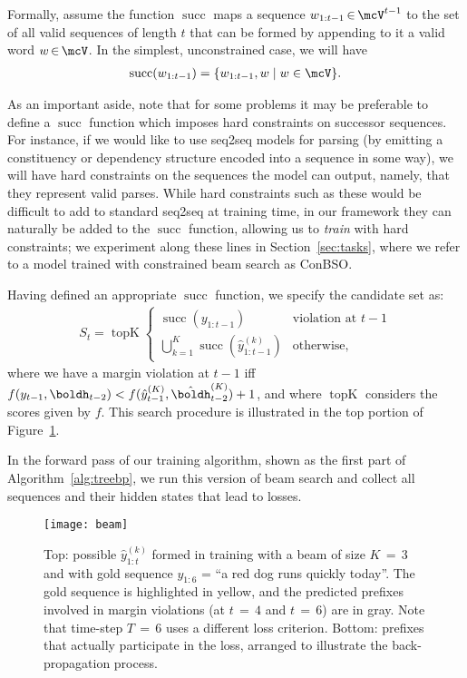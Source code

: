 \documentclass[11pt,letterpaper]{article}
\newcommand{\pfx}[1]{\ensuremath{w_{1:{#1}}}}
\newcommand{\goldpfx}[1]{\ensuremath{y_{1:{#1}}}}
\newcommand{\beampred}[2]{\ensuremath{\hat{y}_{1:{#1}}^{({#2})}}}
\DeclareMathOperator{\suk}{succ}
\DeclareMathOperator{\topK}{topK}
\newcommand{\nicein}{\ensuremath{\,{\in}\,}}
\newcommand{\niceq}{\ensuremath{\,{=}\,}}
\begin{document}
Formally, assume the
function $\suk$ maps a sequence $\pfx{t-1} \nicein \mcV^{t-1}$ to the
set of all valid sequences of length $t$ that can be formed by appending to it a
valid word $w \nicein \mcV$. In the
simplest, unconstrained case, we will have
\begin{align*}
\suk(\pfx{t-1}) = \{\pfx{t-1}, w \mid w \in \mcV \}.
\end{align*}

As an important aside, note that for some problems it may be preferable to define a
$\suk$ function which imposes hard constraints on successor sequences. For instance, if we would like to use seq2seq models for parsing (by emitting a constituency or dependency structure encoded into a sequence in some way), we will have hard constraints on the sequences the model can output, namely, that they represent valid parses. While hard constraints such as these would be difficult to add to standard seq2seq at training time, in our framework they can naturally be added to the $\suk$ function, allowing us to \textit{train} with hard constraints; we experiment along these lines in Section~\ref{sec:tasks}, where we refer to a model trained with constrained beam search as ConBSO. 

Having defined an appropriate $\suk$ function, we specify the candidate set as: 
\begin{align*} \label{eq:stupdate}
S_t =  \topK\begin{cases}  \suk(\goldpfx{t-1}) &\mbox{violation at } t{-}1\\
\bigcup_{k=1}^K \suk(\beampred{t-1}{k}) &\mbox{otherwise}, \end{cases}
\end{align*}
where we have a margin violation at $t{-}1$ iff $f(y_{t-1}, \boldh_{t-2}) < f(\hat{y}_{t-1}^{(K)},\hat{\boldh}_{t-2}^{(K)}) + 1$, and where $\topK$ considers the scores given by $f$. This search procedure is illustrated in the top portion of Figure~\ref{fig:backprop}. 

In the forward pass of our training algorithm, shown as the first part of Algorithm~\ref{alg:treebp}, we run this version of
beam search and collect all sequences and their hidden states that
lead to losses. 

\begin{figure}[t!]
\centering
\texttt{[image: beam]}
\caption{Top: possible $\beampred{t}{k}$ formed in training with a beam of size $K \niceq 3$ and with gold sequence $\goldpfx{6}$ = ``a red dog runs quickly today''. The gold sequence is highlighted in yellow, and the predicted prefixes involved in margin violations (at $t \niceq 4$ and $t \niceq 6$) are in gray. Note that time-step $T \niceq 6$ uses a different loss criterion. Bottom: prefixes that actually participate in the loss, arranged to illustrate the back-propagation process.}
\label{fig:backprop}
\end{figure}
\end{document}
